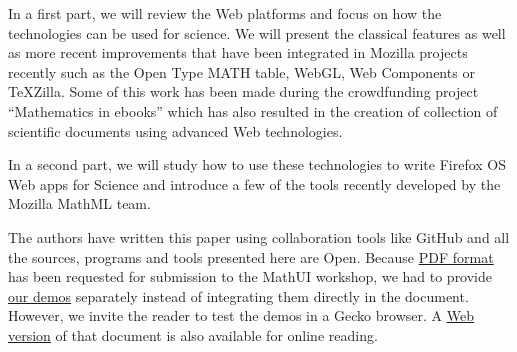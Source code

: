 In a first part, we will review the Web platforms and focus on how the
technologies can be used for science. We will present the classical features
as well as more recent improvements that have been integrated in Mozilla
projects recently such as the Open Type MATH table, WebGL, Web Components or
TeXZilla. Some of this work has been made during the crowdfunding project
``Mathematics in ebooks'' which has also resulted in the creation of collection
of scientific documents using advanced Web technologies.

In a second
part, we will study how to use these technologies to write Firefox OS Web apps
for Science and introduce a few of the tools recently developed by the Mozilla
MathML team.

The authors have written this paper using collaboration tools like GitHub and
all the sources, programs and tools presented here are Open. Because 
\href{http://fred-wang.github.io/MathUI2014/paper/output/MathUI2014-MozillaMathML.pdf}{PDF format}
has been requested for submission to the MathUI workshop, we had to provide
\href{http://fred-wang.github.io/MathUI2014/demos/}{our demos} separately instead of integrating them directly in the document.
However, we invite the reader to test the demos in a Gecko browser. A 
\href{http://fred-wang.github.io/MathUI2014/paper/output/}{Web version} of that document is also available for online reading.
